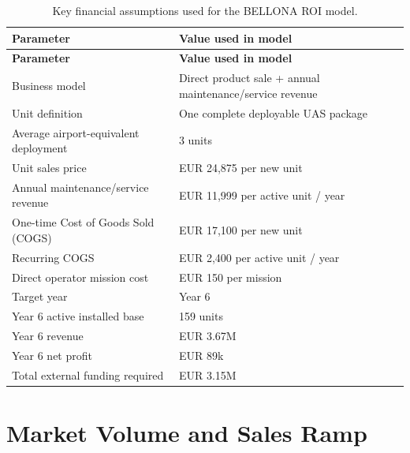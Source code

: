 \begin{center} %
\small
\renewcommand{\arraystretch}{0.95} 
\begin{longtable}{p{}p{}}
    
    \caption{Key financial assumptions used for the BELLONA ROI model.} \label{tab:roi_key_assumptions} \\
    \toprule
    \textbf{Parameter} & \textbf{Value used in model} \\
    \midrule
    \endfirsthead
    
    \toprule
    \textbf{Parameter} & \textbf{Value used in model} \\
    \midrule
    \endhead
    
    \bottomrule
    \endlastfoot

    Business model & Direct product sale + annual maintenance/service revenue \\
    Unit definition & One complete deployable UAS package \\
    Average airport-equivalent deployment & 3 units \\
    Unit sales price & EUR 24,875 per new unit \\
    Annual maintenance/service revenue & EUR 11,999 per active unit / year \\
    One-time Cost of Goods Sold (COGS) & EUR 17,100 per new unit \\
    Recurring COGS & EUR 2,400 per active unit / year \\
    Direct operator mission cost & EUR 150 per mission \\
    Target year & Year 6 \\
    Year 6 active installed base & 159 units \\
    Year 6 revenue & EUR 3.67M \\
    Year 6 net profit & EUR 89k \\
    Total external funding required & EUR 3.15M \\
\end{longtable}
\vspace{-20pt}

\end{center}
\section{Market Volume and Sales Ramp}

